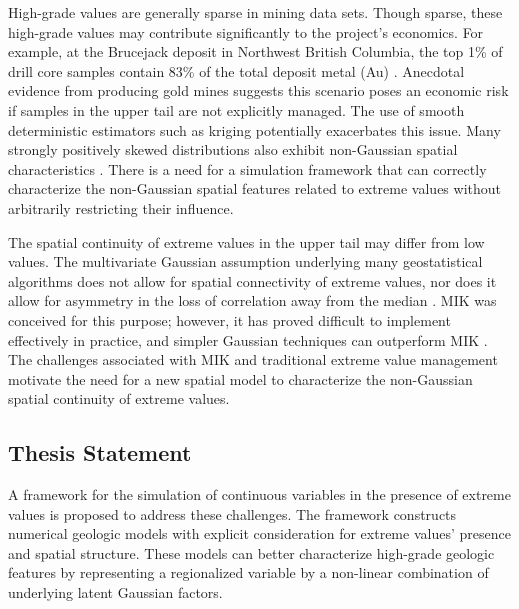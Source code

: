 High-grade values are generally sparse in mining data sets. Though sparse, these high-grade values may contribute significantly to the project's economics. For example, at the Brucejack deposit in Northwest British Columbia, the top 1\% of drill core samples contain 83\% of the total deposit metal (Au) \citep{pretium2020}. Anecdotal evidence from producing gold mines suggests this scenario poses an economic risk if samples in the upper tail are not explicitly managed. The use of smooth deterministic estimators such as kriging potentially exacerbates this issue. Many strongly positively skewed distributions also exhibit non-Gaussian spatial characteristics \citep{journel1989nongaussian}. There is a need for a simulation framework that can correctly characterize the non-Gaussian spatial features related to extreme values without arbitrarily restricting their influence.

The spatial continuity of extreme values in the upper tail may differ from low values. The multivariate Gaussian assumption underlying many geostatistical algorithms does not allow for spatial connectivity of extreme values, nor does it allow for asymmetry in the loss of correlation away from the median \citep{journel1989nongaussian}. \Gls{MIK} \citep{journel1983nonparametric} was conceived for this purpose; however, it has proved difficult to implement effectively in practice, and simpler Gaussian techniques can outperform \gls{MIK} \citep{vincent2021mik}. The challenges associated with \gls{MIK} and traditional extreme value management motivate the need for a new spatial model to characterize the non-Gaussian spatial continuity of extreme values.

\FloatBarrier
\subsection{Thesis Statement}
\label{subsec:01thesis}

A framework for the simulation of continuous variables in the presence of extreme values is proposed to address these challenges. The framework constructs numerical geologic models with explicit consideration for extreme values' presence and spatial structure. These models can better characterize high-grade geologic features by representing a regionalized variable by a non-linear combination of underlying latent Gaussian factors.

